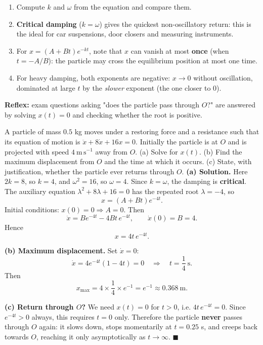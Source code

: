 \documentclass[11pt]{article}
\begin{document}
\begin{methode}
\begin{enumerate}
\item Compute $k$ and $\omega$ from the equation and compare them.
\item \textbf{Critical damping} ($k = \omega$) gives the quickest non-oscillatory return: this is the ideal for car suspensions, door closers and measuring instruments.
\item For $x = (A + Bt)e^{-kt}$, note that $x$ can vanish at most \textbf{once} (when $t = -A/B$): the particle may cross the equilibrium position at most one time.
\item For heavy damping, both exponents are negative: $x \to 0$ without oscillation, dominated at large $t$ by the \emph{slower} exponent (the one closer to $0$).
\end{enumerate}
\textbf{Reflex:} exam questions asking "does the particle pass through $O$?" are answered by solving $x(t) = 0$ and checking whether the root is positive.
\end{methode}

\begin{exoresolu}
A particle of mass $0.5$ kg moves under a restoring force and a resistance such that its equation of motion is $\ddot{x} + 8\dot{x} + 16x = 0$. Initially the particle is at $O$ and is projected with speed $4\ \mathrm{m\,s^{-1}}$ away from $O$. (a) Solve for $x(t)$. (b) Find the maximum displacement from $O$ and the time at which it occurs. (c) State, with justification, whether the particle ever returns through $O$.
\tcblower
\textbf{(a) Solution.} Here $2k = 8$, so $k = 4$, and $\omega^{2} = 16$, so $\omega = 4$. Since $k = \omega$, the damping is \textbf{critical}. The auxiliary equation $\lambda^{2} + 8\lambda + 16 = 0$ has the repeated root $\lambda = -4$, so
\[ x = (A + Bt)e^{-4t}. \]
Initial conditions: $x(0) = 0 \Rightarrow A = 0$. Then
\[ \dot{x} = Be^{-4t} - 4Bt\,e^{-4t}, \qquad \dot{x}(0) = B = 4. \]
Hence
\[ x = 4t\,e^{-4t}. \]

\textbf{(b) Maximum displacement.} Set $\dot{x} = 0$:
\[ \dot{x} = 4e^{-4t}(1 - 4t) = 0 \quad\Longrightarrow\quad t = \frac{1}{4}\ \mathrm{s}. \]
Then
\[ x_{\max} = 4 \times \frac{1}{4} \times e^{-1} = e^{-1} \approx 0.368\ \mathrm{m}. \]

\textbf{(c) Return through $O$?} We need $x(t) = 0$ for $t > 0$, i.e. $4t\,e^{-4t} = 0$. Since $e^{-4t} > 0$ always, this requires $t = 0$ only. Therefore the particle \textbf{never} passes through $O$ again: it slows down, stops momentarily at $t = 0.25$ s, and creeps back towards $O$, reaching it only asymptotically as $t \to \infty$. $\blacksquare$
\end{exoresolu}
\end{document}
